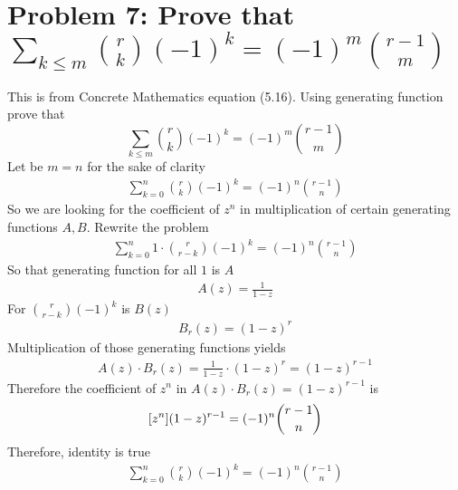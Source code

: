 ﻿\section{Problem 7: Prove that $\sum_{k\leq m} \binom{r}{k} (-1)^k = (-1)^m \binom{r-1}{m}$}
\label{sec:problem-7}

This is from Concrete Mathematics equation (5.16).
Using generating function prove that
\begin{equation}
    \sum_{k\leq m} \binom{r}{k} (-1)^k = (-1)^m \binom{r-1}{m}
    \label{eq:problem-7}
\end{equation}
Let be $m=n$ for the sake of clarity
\begin{align*}
    \sum_{k=0}^{n} \binom{r}{k} (-1)^k = (-1)^n \binom{r-1}{n}
\end{align*}
So we are looking for the coefficient of $z^n$ in multiplication of certain generating functions $A, B$.
Rewrite the problem
\begin{align*}
    \sum_{k=0}^{n} 1 \cdot \binom{r}{r-k} (-1)^k = (-1)^n \binom{r-1}{n}
\end{align*}
So that generating function for all $1$ is $A$
\begin{align*}
    A(z) = \frac{1}{1-z}
\end{align*}
For $\binom{r}{r-k} (-1)^k$ is $B(z)$
\begin{align*}
    B_r (z) = (1-z)^r
\end{align*}
Multiplication of those generating functions yields
\begin{align*}
    A(z) \cdot B_r (z) = \frac{1}{1-z} \cdot (1-z)^r = (1-z)^{r-1}
\end{align*}
Therefore the coefficient of $z^n$ in $A(z) \cdot B_r (z) = (1-z)^{r-1}$ is
\begin{align*}
    [z^{n}] (1-z)^{r-1} = (-1)^n \binom{r-1}{n}
\end{align*}
Therefore, identity is true
\begin{align*}
    \sum_{k=0}^{n} \binom{r}{k} (-1)^k = (-1)^n \binom{r-1}{n}
\end{align*}



\clearpage
